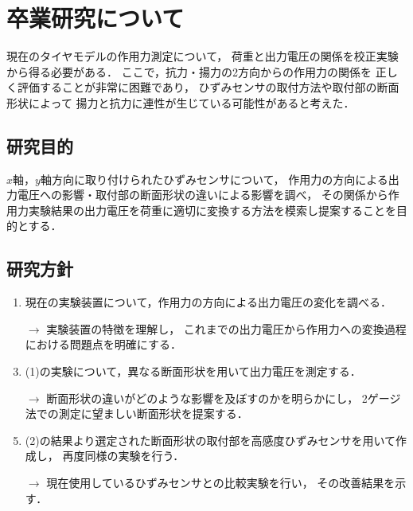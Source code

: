 \documentclass[twocolumn,a4j]{jsarticle}
\begin{document}
\newpage

\section{卒業研究について}

現在のタイヤモデルの作用力測定について，
荷重と出力電圧の関係を校正実験から得る必要がある．
ここで，抗力・揚力の2方向からの作用力の関係を
正しく評価することが非常に困難であり，
ひずみセンサの取付方法や取付部の断面形状によって
揚力と抗力に連性が生じている可能性があると考えた．\\

\subsection{研究目的}
$x$軸，$y$軸方向に取り付けられたひずみセンサについて，
作用力の方向による出力電圧への影響・取付部の断面形状の違いによる影響を調べ，
その関係から作用力実験結果の出力電圧を荷重に適切に変換する方法を模索し提案することを目的とする．\\

\subsection{研究方針}
\begin{enumerate}[(1)]
    \item 現在の実験装置について，作用力の方向による出力電圧の変化を調べる．
    \item [$\rightarrow$] 実験装置の特徴を理解し，
          これまでの出力電圧から作用力への変換過程における問題点を明確にする．
    \item (1)の実験について，異なる断面形状を用いて出力電圧を測定する．
    \item [$\rightarrow$] 断面形状の違いがどのような影響を及ぼすのかを明らかにし，
          2ゲージ法での測定に望ましい断面形状を提案する．
    \item (2)の結果より選定された断面形状の取付部を高感度ひずみセンサを用いて作成し，
          再度同様の実験を行う．
    \item [$\rightarrow$] 現在使用しているひずみセンサとの比較実験を行い，
          その改善結果を示す．
\end{enumerate}
\end{document}
